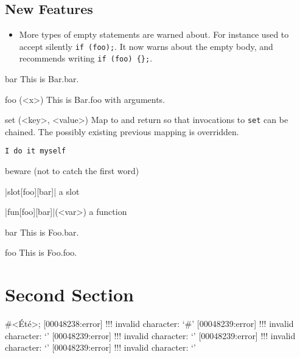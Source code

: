 \documentclass[openright,twoside,11pt]{book}
\begin{document}
\section{}

\subsection{New Features}
\begin{itemize}
\item More types of empty statements are warned about.  For instance \urbi
  used to accept silently \lstinline|if (foo);|.  It now warns about the empty
  body, and recommends writing \lstinline|if (foo) {};|.
\end{itemize}



\begin{urbiscriptapi}
\item[bar] This is Bar.bar.
\item[foo](<x>) This is Bar.foo with arguments.
\item[set](<key>, <value>) Map  to  and return \this so
  that invocations to \lstinline|set| can be chained.  The possibly existing
  previous mapping is overridden.
\item \lstinline|I do it myself|
\item beware (not to catch the first word)
\item|slot[foo][bar]| a slot
\item|fun[foo][bar]|(<var>) a function
\end{urbiscriptapi}


\begin{urbiscriptapi}
\item[bar] This is Foo.bar.
\item[foo] This is Foo.foo.
\end{urbiscriptapi}

\section{Second Section}

\begin{urbiunchecked}[escapeinside=<>]
#<Été>;
[00048238:error] !!! invalid character: `#'
[00048239:error] !!! invalid character: `'
[00048239:error] !!! invalid character: `'
[00048239:error] !!! invalid character: `'
[00048239:error] !!! invalid character: `'
\end{urbiunchecked}
\end{document}
